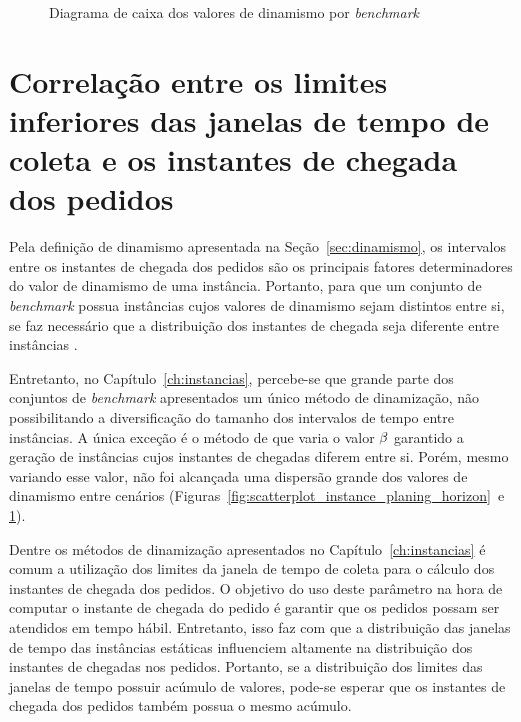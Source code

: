 \begin{figure}[H]
    \centering
    \caption{Diagrama de caixa dos valores de dinamismo por \textit{benchmark}}
    \label{fig:dynamism_boxplot_planing_horizon}
\end{figure}





\section{Correlação entre os limites inferiores das janelas de tempo de coleta 
e os instantes de chegada dos pedidos}

Pela definição de dinamismo apresentada na Seção~\ref{sec:dinamismo}, os 
intervalos entre os instantes de chegada dos pedidos são os principais fatores
determinadores do valor de dinamismo de uma instância.
Portanto, para que um conjunto de \textit{benchmark} possua instâncias cujos 
valores de dinamismo sejam distintos entre si, se faz necessário que a 
distribuição dos instantes de chegada seja diferente entre instâncias 
\cite{van_lon_measures_2016}.

Entretanto, no Capítulo~\ref{ch:instancias}, percebe-se que grande parte dos 
conjuntos de \textit{benchmark} apresentados um único método de 
dinamização, não possibilitando a diversificação do tamanho dos intervalos de 
tempo entre instâncias.
A única exceção é o método de  que varia o 
valor $\beta$ garantido a geração de instâncias cujos instantes de 
chegadas diferem entre si.
Porém, mesmo variando esse valor, não foi alcançada uma dispersão grande 
dos valores de dinamismo entre cenários 
(Figuras~\ref{fig:scatterplot_instance_planing_horizon}~e
\ref{fig:dynamism_boxplot_planing_horizon}).

Dentre os métodos de dinamização apresentados no Capítulo~\ref{ch:instancias} é 
comum a utilização dos limites da janela de tempo de coleta para o cálculo dos 
instantes de chegada dos pedidos.
O objetivo do uso deste parâmetro na hora de computar o instante de chegada do 
pedido é garantir que os pedidos possam ser atendidos em tempo hábil.
Entretanto, isso faz com que a distribuição das janelas de tempo das instâncias
estáticas influenciem altamente na distribuição dos instantes de chegadas nos 
pedidos.
Portanto, se a distribuição dos limites das janelas de tempo possuir acúmulo 
de valores, pode-se esperar que os instantes de chegada dos pedidos também  
possua o mesmo acúmulo.

